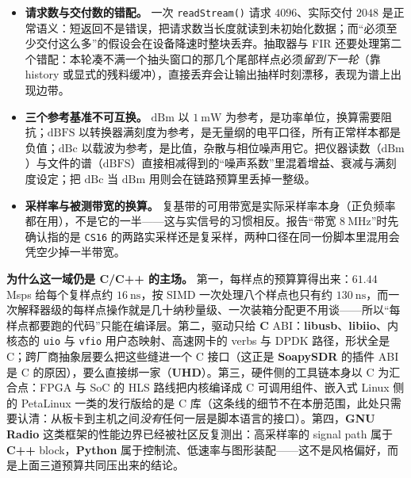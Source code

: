 \documentclass[12pt,a4paper,fontset=fandol]{ctexbook}
\newcommand{\Fn}[1]{\texttt{#1()}}
\newcommand{\Tp}[1]{\texttt{#1}}
\newcommand{\Bk}{\allowbreak}
\newcommand{\Lib}[1]{\textbf{#1}}
\newcommand{\Lang}[1]{\textsf{\bfseries #1}}
\newcommand{\CL}{\Lang{C}}
\newcommand{\CPP}{\Lang{C++}}
\newcommand{\PY}{\Lang{Python}}
\begin{document}
\begin{note}[title={短返回、参考基准与带宽口径}]
\begin{itemize}
\item \textbf{请求数与交付数的错配。} 一次 \Fn{readStream} 请求 $4096$、实际交付 $2048$ 是正常语义：短返回不是错误，把请求数当长度就读到未初始化数据；而``必须至少交付这么多''的假设会在设备降速时整块丢弃。抽取器与 FIR 还要处理第二个错配：本轮凑不满一个抽头窗口的那几个尾部样点必须\emph{留到下一轮}（靠 history 或显式的残料缓冲），直接丢弃会让输出抽样时刻漂移，表现为谱上出现边带。
\item \textbf{三个参考基准不可互换。} $\text{dBm}$ 以 $1\ \text{mW}$ 为参考，是功率单位，换算需要阻抗；$\text{dBFS}$ 以转换器满刻度为参考，是无量纲的电平口径，所有正常样本都是负值；$\text{dBc}$ 以载波为参考，是比值，杂散与相位噪声用它。把仪器读数（$\text{dBm}$）与文件的谱（$\text{dBFS}$）直接相减得到的``噪声系数''里混着增益、衰减与满刻度设定；把 $\text{dBc}$ 当 $\text{dBm}$ 用则会在链路预算里丢掉一整级。
\item \textbf{采样率与被测带宽的换算。} 复基带的可用带宽是实际采样率本身（正负频率都在用），不是它的一半——这与实信号的习惯相反。报告``带宽 $8\ \text{MHz}$''时先确认指的是 \Tp{CS16} 的两路实采样还是复采样，两种口径在同一份脚本里混用会凭空少掉一半带宽。
\end{itemize}
\end{note}

\textbf{为什么这一域仍是 \CL/{\Bk}\CPP{} 的主场。} 第一，每样点的预算算得出来：$61.44$ Msps 给每个复样点约 $16\ \text{ns}$，按 SIMD 一次处理八个样点也只有约 $130\ \text{ns}$，而一次解释器级的每样点操作就是几十纳秒量级、一次装箱分配更不用谈——所以``每样点都要跑的代码''只能在编译层。第二，驱动只给 \CL{} ABI：\Lib{libusb}、\Lib{libiio}、内核态的 \Tp{uio} 与 \Tp{vfio} 用户态映射、高速网卡的 verbs 与 DPDK 路径，形状全是 C；跨厂商抽象层要么把这些缝进一个 C 接口（这正是 \Lib{SoapySDR} 的插件 ABI 是 C 的原因），要么直接绑一家（\Lib{UHD}）。第三，硬件侧的工具链本身以 C 为汇合点：FPGA 与 SoC 的 HLS 路线把内核编译成 C 可调用组件、嵌入式 Linux 侧的 PetaLinux 一类的发行版给的是 C 库（这条线的细节不在本册范围，此处只需要认清：从板卡到主机之间\emph{没有}任何一层是脚本语言的接口）。第四，\Lib{GNU Radio} 这类框架的性能边界已经被社区反复测出：高采样率的 signal path 属于 \CPP{} block，\PY{} 属于控制流、低速率与图形装配——这不是风格偏好，而是上面三道预算共同压出来的结论。
\end{document}
